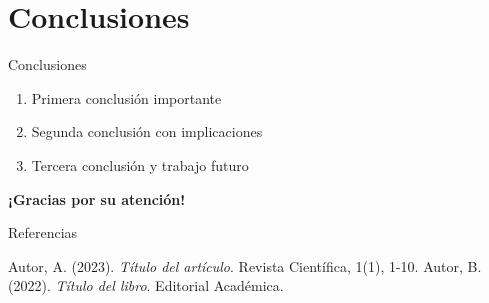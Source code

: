 \documentclass[aspectratio=169]{beamer}
\begin{document}
\section{Conclusiones}

\begin{frame}{Conclusiones}
    \begin{enumerate}
        \item Primera conclusión importante
        \item Segunda conclusión con implicaciones
        \item Tercera conclusión y trabajo futuro
    \end{enumerate}
    
    \vspace{1cm}
    
    \begin{center}
        \large \textbf{¡Gracias por su atención!}
    \end{center}
\end{frame}

\begin{frame}{Referencias}
    \begin{thebibliography}{99}
         Autor, A. (2023). \textit{Título del artículo}. Revista Científica, 1(1), 1-10.
         Autor, B. (2022). \textit{Título del libro}. Editorial Académica.
    \end{thebibliography}
\end{frame}
\end{document}
